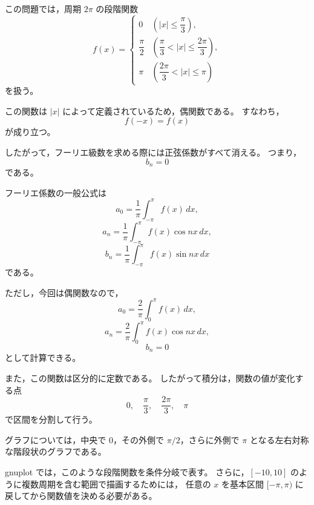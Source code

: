 \begin{background}
	この問題では，周期 \(2\pi\) の段階関数
	\[
	f(x)=
	\begin{cases}
		0
		& \left(|x|\leq \dfrac{\pi}{3}\right),\\[6pt]
		\dfrac{\pi}{2}
		& \left(\dfrac{\pi}{3}<|x|\leq \dfrac{2\pi}{3}\right),\\[6pt]
		\pi
		& \left(\dfrac{2\pi}{3}<|x|\leq \pi\right)
	\end{cases}
	\]
	を扱う。
	
	この関数は \(|x|\) によって定義されているため，偶関数である。
	すなわち，
	\[
	f(-x)=f(x)
	\]
	が成り立つ。
	
	したがって，フーリエ級数を求める際には正弦係数がすべて消える。
	つまり，
	\[
	b_n=0
	\]
	である。
	
	フーリエ係数の一般公式は
	\[
	a_0=\frac{1}{\pi}\int_{-\pi}^{\pi}f(x)\,dx,
	\]
	\[
	a_n=\frac{1}{\pi}\int_{-\pi}^{\pi}f(x)\cos nx\,dx,
	\]
	\[
	b_n=\frac{1}{\pi}\int_{-\pi}^{\pi}f(x)\sin nx\,dx
	\]
	である。
	
	ただし，今回は偶関数なので，
	\[
	a_0=\frac{2}{\pi}\int_0^\pi f(x)\,dx,
	\]
	\[
	a_n=\frac{2}{\pi}\int_0^\pi f(x)\cos nx\,dx,
	\]
	\[
	b_n=0
	\]
	として計算できる。
	
	また，この関数は区分的に定数である。
	したがって積分は，関数の値が変化する点
	\[
	0,\quad \frac{\pi}{3},\quad \frac{2\pi}{3},\quad \pi
	\]
	で区間を分割して行う。
	
	グラフについては，中央で \(0\)，その外側で \(\pi/2\)，さらに外側で \(\pi\)
	となる左右対称な階段状のグラフである。
	
	gnuplot では，このような段階関数を条件分岐で表す。
	さらに，\([-10,10]\) のように複数周期を含む範囲で描画するためには，
	任意の \(x\) を基本区間 \([-\pi,\pi)\) に戻してから関数値を決める必要がある。
\end{background}
